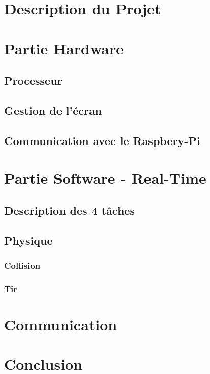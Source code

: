 

\tableofcontents

\chapter{Description du Projet}
\chapter{Partie Hardware}
\section{Processeur}
\section{Gestion de l'écran}
\section{Communication avec le Raspbery-Pi}
\chapter{Partie Software - Real-Time}

\section{Description des 4 tâches}

\section{Physique}
	\subsection{Collision}
	\subsection{Tir}

\chapter{Communication}
\chapter{Conclusion}
